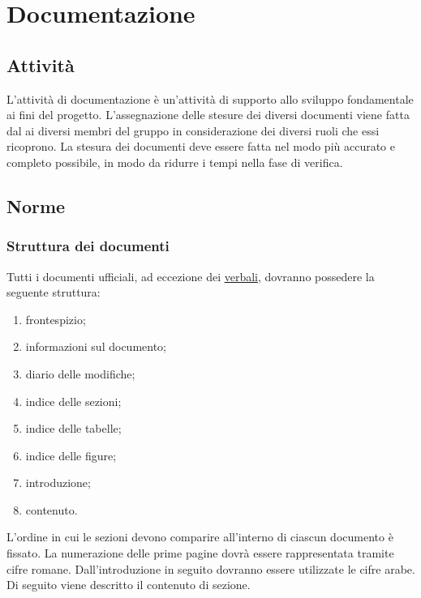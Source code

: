 \section{Documentazione}
	\subsection{Attività}
	L'attività di documentazione è un'attività di supporto allo sviluppo fondamentale ai fini del progetto.
	L'assegnazione delle stesure dei diversi documenti viene fatta dal  ai diversi membri del gruppo in considerazione dei diversi ruoli che essi ricoprono.
	La stesura dei documenti deve essere fatta nel modo più accurato e completo possibile, in modo da ridurre i tempi nella fase di verifica.
	\subsection{Norme}
		\subsubsection{Struttura dei documenti}
			Tutti i documenti ufficiali, ad eccezione dei \hyperref[sec:verbali]{verbali}, dovranno possedere la seguente struttura:
			\begin{enumerate}
				\item frontespizio;
				\item informazioni sul documento;
				\item diario delle modifiche;
				\item indice delle sezioni;
				\item indice delle tabelle;
				\item indice delle figure;
				\item introduzione;
				\item contenuto.
			\end{enumerate}
			L’ordine in cui le sezioni devono comparire all’interno di ciascun documento è fissato. La numerazione delle prime pagine dovrà essere rappresentata tramite cifre romane. Dall'introduzione in seguito dovranno essere utilizzate le cifre arabe. \\
			Di seguito viene descritto il contenuto di sezione.
